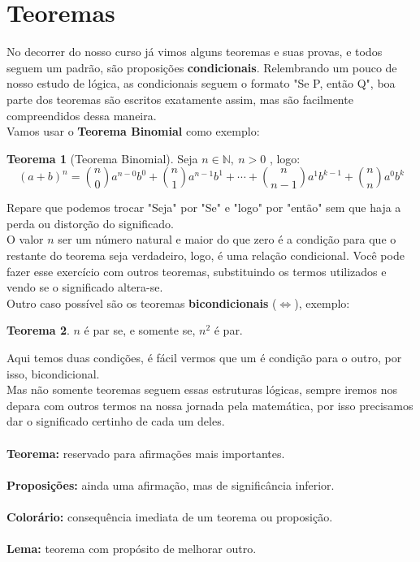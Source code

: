 \documentclass[a4paper,11pt,oneside]{book}
\theoremstyle{definition}
\theoremstyle{break}
\newtheorem{theorem}{Teorema}
\begin{document}
\section{Teoremas}
No decorrer do nosso curso já vimos alguns teoremas e suas provas, e todos seguem um padrão, são proposições \textbf{condicionais}. Relembrando um pouco de nosso estudo de lógica, as condicionais seguem o formato "Se P, então Q", boa parte dos teoremas são escritos exatamente assim, mas são facilmente compreendidos dessa maneira.
\\
Vamos usar o \textbf{Teorema Binomial} como exemplo:
\begin{theorem}[Teorema Binomial]
Seja $n \in \mathbb{N}, \ n>0$ , logo:
$$(a+b)^n = {n \choose 0}a^{n-0}b^{0} + {n \choose 1}a^{n-1}b^1 + \cdots + {n \choose n-1}a^1b^{k-1} + {n \choose n}a^{0}b^k $$
\end{theorem}
Repare que podemos trocar "Seja" por "Se" e "logo" por "então" sem que haja a perda ou distorção do significado.
\\
O valor $n$ ser um número natural e maior do que zero é a condição para que o restante do teorema seja verdadeiro, logo, é uma relação condicional. Você pode fazer esse exercício com outros teoremas, substituindo os termos utilizados e vendo se o significado altera-se.
\\
Outro caso possível são os teoremas \textbf{bicondicionais} ($\Leftrightarrow$), exemplo:
\\
\begin{theorem}
$n$ é par se, e somente se, $n^2$ é par.
\end{theorem}
Aqui temos duas condições, é fácil vermos que um é condição para o outro, por isso, bicondicional.
\\
Mas não somente teoremas seguem essas estruturas lógicas, sempre iremos nos depara com outros termos na nossa jornada pela matemática, por isso precisamos dar o significado certinho de cada um deles.
\\ \\
\textbf{Teorema:} reservado para afirmações mais importantes.
\\ \\
\textbf{Proposições:} ainda uma afirmação, mas de significância inferior.
\\ \\
\textbf{Colorário:} consequência imediata de um teorema ou proposição.
\\ \\
\textbf{Lema:} teorema com propósito de melhorar outro. 
\end{document}
